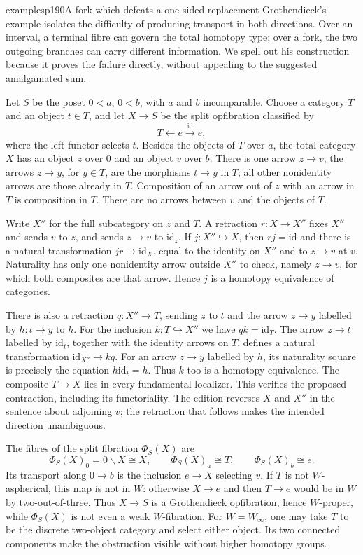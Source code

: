 \begin{dcomment}{examples}{p190}{A fork which defeats a one-sided replacement}
Grothendieck's example isolates the difficulty of producing transport in both directions. Over an interval, a terminal fibre can govern the total homotopy type; over a fork, the two outgoing branches can carry different information. We spell out his construction because it proves the failure directly, without appealing to the suggested amalgamated sum.

Let $S$ be the poset $0<a$, $0<b$, with $a$ and $b$ incomparable. Choose a category $T$ and an object $t\in T$, and let $X\to S$ be the split opfibration classified by
\[
T\longleftarrow e\xrightarrow{\mathrm{id}}e,
\]
where the left functor selects $t$. Besides the objects of $T$ over $a$, the total category $X$ has an object $z$ over $0$ and an object $v$ over $b$. There is one arrow $z\to v$; the arrows $z\to y$, for $y\in T$, are the morphisms $t\to y$ in $T$; all other nonidentity arrows are those already in $T$. Composition of an arrow out of $z$ with an arrow in $T$ is composition in $T$. There are no arrows between $v$ and the objects of $T$.

Write $X''$ for the full subcategory on $z$ and $T$. A retraction $r:X\to X''$ fixes $X''$ and sends $v$ to $z$, and sends $z\to v$ to $\mathrm{id}_z$. If $j:X''\hookrightarrow X$, then $rj=\mathrm{id}$ and there is a natural transformation $jr\to\mathrm{id}_X$, equal to the identity on $X''$ and to $z\to v$ at $v$. Naturality has only one nonidentity arrow outside $X''$ to check, namely $z\to v$, for which both composites are that arrow. Hence $j$ is a homotopy equivalence of categories.

There is also a retraction $q:X''\to T$, sending $z$ to $t$ and the arrow $z\to y$ labelled by $h:t\to y$ to $h$. For the inclusion $k:T\hookrightarrow X''$ we have $qk=\mathrm{id}_T$. The arrow $z\to t$ labelled by $\mathrm{id}_t$, together with the identity arrows on $T$, defines a natural transformation $\mathrm{id}_{X''}\to kq$. For an arrow $z\to y$ labelled by $h$, its naturality square is precisely the equation $h\mathrm{id}_t=h$. Thus $k$ too is a homotopy equivalence. The composite $T\to X$ lies in every fundamental localizer. This verifies the proposed contraction, including its functoriality. The edition reverses $X$ and $X''$ in the sentence about adjoining $v$; the retraction that follows makes the intended direction unambiguous.

The fibres of the split fibration $\Phi_S(X)$ are
\[
\Phi_S(X)_0=0\backslash X\cong X,
\qquad \Phi_S(X)_a\cong T,
\qquad \Phi_S(X)_b\cong e.
\]
Its transport along $0\to b$ is the inclusion $e\to X$ selecting $v$. If $T$ is not $W$-aspherical, this map is not in $W$: otherwise $X\to e$ and then $T\to e$ would be in $W$ by two-out-of-three. Thus $X\to S$ is a Grothendieck opfibration, hence $W$-proper, while $\Phi_S(X)$ is not even a weak $W$-fibration. For $W=W_\infty$, one may take $T$ to be the discrete two-object category and select either object. Its two connected components make the obstruction visible without higher homotopy groups.


\end{dcomment}
